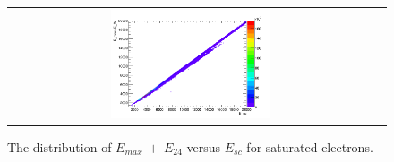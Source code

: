 \begin{figure}[bh]
  \begin{center}
    \begin{tabular}{cc}
      \includegraphics[width=0.45\textwidth]{chapters/Zprime/Saturation/images/FlatPt/Sample_variables/Esc_EmaxE24.png}
    \end{tabular}
    \caption{The distribution of $E_{max}~ + ~E_{24}$ versus $E_{sc}$ for saturated electrons.}
    \label{fig:EmaxE24_Esc}
  \end{center}
\end{figure}

